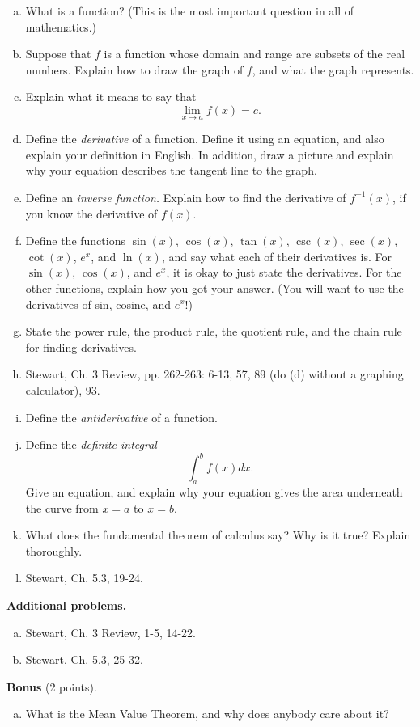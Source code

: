\documentclass[12pt]{article}
\begin{document}
\begin{enumerate}[(a)]
\item
What is a function? (This is the most important question in all of mathematics.)

\item
Suppose that $f$ is a function whose domain and range are subsets of the real numbers.
Explain how to draw the graph of $f$, and what the graph represents.

\item
Explain what it means to say that
$$\lim_{x \rightarrow a} f(x) = c.$$

\item
Define the {\itshape derivative} of a function. Define it using an equation, and also explain
your definition in English. In addition, draw a picture and explain why your equation describes
the tangent line to the graph.

\item
Define an {\itshape inverse function.}
Explain how to find the derivative of $f^{-1}(x)$, if you know the derivative of $f(x)$.

\item
Define the functions $\sin(x)$, $\cos(x)$, $\tan(x)$, $\csc(x)$, $\sec(x)$, $\cot(x)$, $e^x$, and
$\ln(x)$, and say what each of their derivatives is. For $\sin(x)$, $\cos(x)$, and $e^x$, it is okay
to just state the derivatives. For the other functions, explain how you got your answer. (You will want
to use the derivatives of sin, cosine, and $e^x$!)

\item
State the power rule, the product rule, the quotient rule, and the chain rule for finding derivatives.

\item
Stewart, Ch. 3 Review, pp. 262-263: 6-13, 57, 89 (do (d) without a graphing calculator),
93.

\item
Define the {\itshape antiderivative} of a function.

\item
Define the {\itshape definite integral}
$$\int_a^b f(x) dx.$$
Give an equation, and explain why your equation gives the area underneath the curve from $x = a$
to $x =b$.

\item
What does the fundamental theorem of calculus say? Why is it true? Explain thoroughly.

\item
Stewart, Ch. 5.3, 19-24.

\end{enumerate}
{\bf Additional problems.}
\begin{enumerate}[(a)]
\item
Stewart, Ch. 3 Review, 1-5, 14-22.

\item
Stewart, Ch. 5.3, 25-32.

\end{enumerate}
{\bf Bonus} (2 points).
\begin{enumerate}[(a)]
\item
What is the Mean Value Theorem, and why does anybody care about it?

\end{enumerate}
\end{document}
